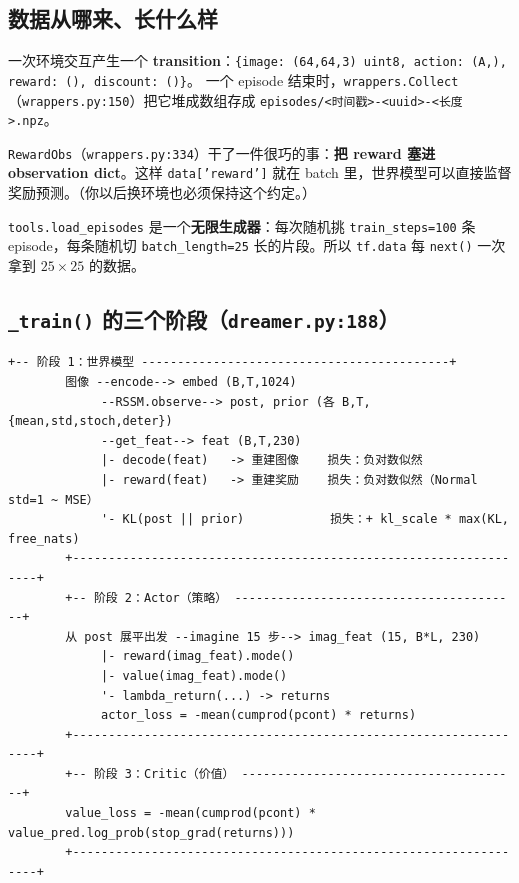 \documentclass[11pt]{ctexart}
\begin{document}
\subsection{数据从哪来、长什么样}
一次环境交互产生一个 \textbf{transition}：\texttt{\{image: (64,64,3) uint8, action: (A,), reward: (), discount: ()\}}。
一个 episode 结束时，\texttt{wrappers.Collect}（\texttt{wrappers.py:150}）把它堆成数组存成 \texttt{episodes/<时间戳>-<uuid>-<长度>.npz}。

\texttt{RewardObs}（\texttt{wrappers.py:334}）干了一件很巧的事：\textbf{把 reward 塞进 observation dict}。这样 \texttt{data['reward']} 就在 batch 里，世界模型可以直接监督奖励预测。（你以后换环境也必须保持这个约定。）

\texttt{tools.load\_episodes} 是一个\textbf{无限生成器}：每次随机挑 \texttt{train\_steps=100} 条 episode，每条随机切 \texttt{batch\_length=25} 长的片段。所以 \texttt{tf.data} 每 \texttt{next()} 一次拿到 $25 \times 25$ 的数据。

\subsection{\texttt{\_train()} 的三个阶段（\texttt{dreamer.py:188}）}
\begin{Verbatim}[frame=single,fontsize=\small]
        +-- 阶段 1：世界模型 -------------------------------------------+
        图像 --encode--> embed (B,T,1024)
             --RSSM.observe--> post, prior (各 B,T,{mean,std,stoch,deter})
             --get_feat--> feat (B,T,230)
             |- decode(feat)   -> 重建图像    损失：负对数似然
             |- reward(feat)   -> 重建奖励    损失：负对数似然（Normal std=1 ~ MSE）
             '- KL(post || prior)            损失：+ kl_scale * max(KL, free_nats)
        +-----------------------------------------------------------------+
        +-- 阶段 2：Actor（策略） ----------------------------------------+
        从 post 展平出发 --imagine 15 步--> imag_feat (15, B*L, 230)
             |- reward(imag_feat).mode()
             |- value(imag_feat).mode()
             '- lambda_return(...) -> returns
             actor_loss = -mean(cumprod(pcont) * returns)
        +-----------------------------------------------------------------+
        +-- 阶段 3：Critic（价值） ---------------------------------------+
        value_loss = -mean(cumprod(pcont) * value_pred.log_prob(stop_grad(returns)))
        +-----------------------------------------------------------------+
\end{Verbatim}
\end{document}

